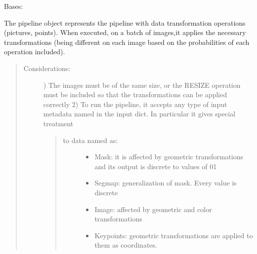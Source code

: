 \documentclass[letterpaper,10pt,english]{sphinxmanual}
\begin{document}
\begin{fulllineitems}
\label{\detokenize{ida_lib.core:ida_lib.core.pipeline.Pipeline}}
Bases: 

The pipeline object represents the pipeline with data transformation operations (pictures, points). When executed,
on a batch of images,it applies the necessary transformations (being different on each image based on the
probabilities of each operation included).
\begin{quote}
\begin{description}
\item[{Considerations:}] )  The images must be of the same size, or the RESIZE operation must be included so that the
transformations can be applied correctly
2)  To run the pipeline, it accepts any type of input metadata named in the input dict. In particular it
gives special treatment
\begin{quote}
\begin{description}
\item[{to data named as:}] \leavevmode\begin{itemize}
\item {} 
Mask: it is affected by geometric transformations and its output is discrete to values of 0\sphinxhyphen{}1

\item {} 
Segmap: generalization of mask. Every value is discrete

\item {} 
Image:  affected by geometric and color transformations

\item {} 
Keypoints: geometric transformations are applied to them as coordinates.


\end{itemize}
\end{description}
\end{quote}
\end{description}
\end{quote}
\end{fulllineitems}
\end{document}
